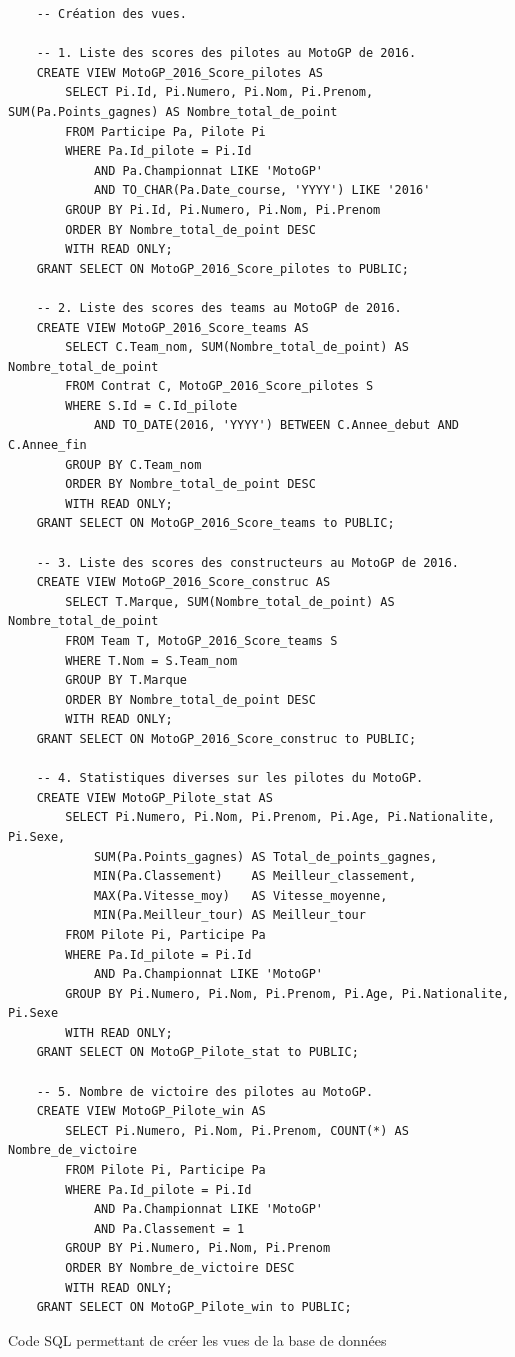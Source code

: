 \documentclass[12pt,a4paper]{article}
\newenvironment{code}{\captionsetup{type=listing}}{}
\begin{document}
\begin{code}
    \begin{verbatim}
    -- Création des vues.

    -- 1. Liste des scores des pilotes au MotoGP de 2016.
    CREATE VIEW MotoGP_2016_Score_pilotes AS
        SELECT Pi.Id, Pi.Numero, Pi.Nom, Pi.Prenom, SUM(Pa.Points_gagnes) AS Nombre_total_de_point
        FROM Participe Pa, Pilote Pi
        WHERE Pa.Id_pilote = Pi.Id
            AND Pa.Championnat LIKE 'MotoGP'
            AND TO_CHAR(Pa.Date_course, 'YYYY') LIKE '2016'
        GROUP BY Pi.Id, Pi.Numero, Pi.Nom, Pi.Prenom
        ORDER BY Nombre_total_de_point DESC
        WITH READ ONLY;
    GRANT SELECT ON MotoGP_2016_Score_pilotes to PUBLIC;
        
    -- 2. Liste des scores des teams au MotoGP de 2016.
    CREATE VIEW MotoGP_2016_Score_teams AS
        SELECT C.Team_nom, SUM(Nombre_total_de_point) AS Nombre_total_de_point
        FROM Contrat C, MotoGP_2016_Score_pilotes S
        WHERE S.Id = C.Id_pilote
            AND TO_DATE(2016, 'YYYY') BETWEEN C.Annee_debut AND C.Annee_fin
        GROUP BY C.Team_nom
        ORDER BY Nombre_total_de_point DESC
        WITH READ ONLY;
    GRANT SELECT ON MotoGP_2016_Score_teams to PUBLIC;

    -- 3. Liste des scores des constructeurs au MotoGP de 2016.
    CREATE VIEW MotoGP_2016_Score_construc AS
        SELECT T.Marque, SUM(Nombre_total_de_point) AS Nombre_total_de_point
        FROM Team T, MotoGP_2016_Score_teams S
        WHERE T.Nom = S.Team_nom
        GROUP BY T.Marque
        ORDER BY Nombre_total_de_point DESC
        WITH READ ONLY;
    GRANT SELECT ON MotoGP_2016_Score_construc to PUBLIC;

    -- 4. Statistiques diverses sur les pilotes du MotoGP.
    CREATE VIEW MotoGP_Pilote_stat AS
        SELECT Pi.Numero, Pi.Nom, Pi.Prenom, Pi.Age, Pi.Nationalite, Pi.Sexe,
            SUM(Pa.Points_gagnes) AS Total_de_points_gagnes,
            MIN(Pa.Classement)    AS Meilleur_classement,
            MAX(Pa.Vitesse_moy)   AS Vitesse_moyenne,
            MIN(Pa.Meilleur_tour) AS Meilleur_tour
        FROM Pilote Pi, Participe Pa
        WHERE Pa.Id_pilote = Pi.Id
            AND Pa.Championnat LIKE 'MotoGP'
        GROUP BY Pi.Numero, Pi.Nom, Pi.Prenom, Pi.Age, Pi.Nationalite, Pi.Sexe
        WITH READ ONLY;
    GRANT SELECT ON MotoGP_Pilote_stat to PUBLIC;

    -- 5. Nombre de victoire des pilotes au MotoGP.
    CREATE VIEW MotoGP_Pilote_win AS
        SELECT Pi.Numero, Pi.Nom, Pi.Prenom, COUNT(*) AS Nombre_de_victoire
        FROM Pilote Pi, Participe Pa
        WHERE Pa.Id_pilote = Pi.Id
            AND Pa.Championnat LIKE 'MotoGP'
            AND Pa.Classement = 1
        GROUP BY Pi.Numero, Pi.Nom, Pi.Prenom
        ORDER BY Nombre_de_victoire DESC
        WITH READ ONLY;
    GRANT SELECT ON MotoGP_Pilote_win to PUBLIC;
    \end{verbatim}
    \caption{Code SQL permettant de créer les vues de la base de données}
    \label{lst.create}
\end{code}
\end{document}
